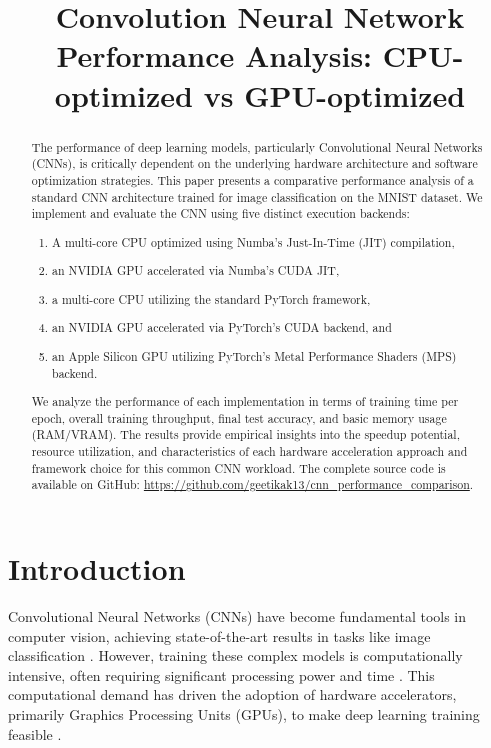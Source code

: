 \documentclass[conference]{IEEEtran} %
\begin{document}
\title{Convolution Neural Network Performance Analysis: CPU-optimized vs GPU-optimized}

\author{
}

\maketitle

\begin{abstract}
    The performance of deep learning models, particularly Convolutional Neural Networks (CNNs), is critically dependent on the underlying hardware architecture and software optimization strategies. This paper presents a comparative performance analysis of a standard CNN architecture trained for image classification on the MNIST dataset. We implement and evaluate the CNN using five distinct execution backends: 
    \begin{enumerate}
        \item A multi-core CPU optimized using Numba's Just-In-Time (JIT) compilation,
        \item an NVIDIA GPU accelerated via Numba's CUDA JIT,
        \item a multi-core CPU utilizing the standard PyTorch framework,
        \item an NVIDIA GPU accelerated via PyTorch's CUDA backend, and
        \item an Apple Silicon GPU utilizing PyTorch's Metal Performance Shaders (MPS) backend.
    \end{enumerate}
    We analyze the performance of each implementation in terms of training time per epoch, overall training throughput, final test accuracy, and basic memory usage (RAM/VRAM). The results provide empirical insights into the speedup potential, resource utilization, and characteristics of each hardware acceleration approach and framework choice for this common CNN workload. The complete source code is available on GitHub: \url{https://github.com/geetikak13/cnn_performance_comparison}.
\end{abstract}


\section{Introduction}
\label{sec:introduction}
Convolutional Neural Networks (CNNs) have become fundamental tools in computer vision, achieving state-of-the-art results in tasks like image classification \cite{Krizhevsky2012}. However, training these complex models is computationally intensive, often requiring significant processing power and time \cite{Sze2017}. This computational demand has driven the adoption of hardware accelerators, primarily Graphics Processing Units (GPUs), to make deep learning training feasible \cite{Krizhevsky2012}.
\end{document}
